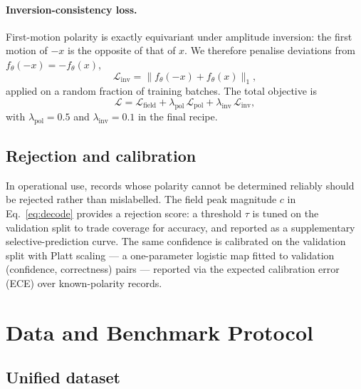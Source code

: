\documentclass[11pt]{article}
\begin{document}
\paragraph{Inversion-consistency loss.}
First-motion polarity is exactly equivariant under amplitude inversion: the
first motion of $-x$ is the opposite of that of $x$. We therefore penalise
deviations from $f_\theta(-x) = -f_\theta(x)$,
\begin{equation}
  \mathcal{L}_\mathrm{inv}
  = \big\| f_\theta(-x) + f_\theta(x) \big\|_1 ,
  \label{eq:invloss}
\end{equation}
applied on a random fraction of training batches. The total objective is
\begin{equation}
  \mathcal{L}
  = \mathcal{L}_\mathrm{field}
  + \lambda_\mathrm{pol}\,\mathcal{L}_\mathrm{pol}
  + \lambda_\mathrm{inv}\,\mathcal{L}_\mathrm{inv},
  \label{eq:total}
\end{equation}
with $\lambda_\mathrm{pol}=0.5$ and $\lambda_\mathrm{inv}=0.1$ in the final
recipe.

\subsection{Rejection and calibration}
\label{sec:calibration}

In operational use, records whose polarity cannot be determined reliably
should be rejected rather than mislabelled. The field peak magnitude $c$ in
Eq.~\eqref{eq:decode} provides a rejection score: a threshold $\tau$ is tuned
on the validation split to trade coverage for accuracy, and reported as a
supplementary selective-prediction curve. The same confidence is calibrated on
the validation split with Platt scaling \citep{platt1999calibration} --- a
one-parameter logistic map fitted to validation (confidence, correctness)
pairs --- reported via the expected calibration error (ECE) over
known-polarity records.

\section{Data and Benchmark Protocol}
\label{sec:data}

\subsection{Unified dataset}
\label{sec:dataset}
\end{document}
